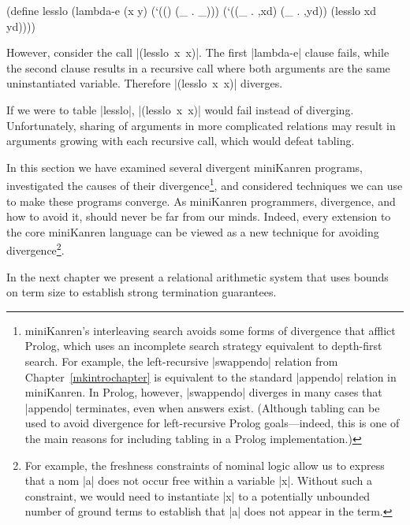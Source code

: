 \begin{enumerate}
\schemedisplayspace
\begin{schemebox}
(define lesslo
  (lambda-e (x y)
    (`(() (_ . _)))
    (`((_ . ,xd) (_ . ,yd))
     (lesslo xd yd))))
\end{schemebox}

However, consider the call \mbox{\scheme|(lesslo x x)|}.  The
first \scheme|lambda-e| clause fails, while the second clause results
in a recursive call where both arguments are the same uninstantiated
variable.  Therefore \mbox{\scheme|(lesslo x x)|} diverges.

If we were to table \scheme|lesslo|, \mbox{\scheme|(lesslo x x)|}
would fail instead of diverging.  Unfortunately, sharing of arguments
in more complicated relations may result in arguments growing with
each recursive call, which would defeat tabling.

\end{enumerate}

In this section we have examined several divergent miniKanren
programs, investigated the causes of their
divergence\footnote{miniKanren's interleaving search avoids some forms
  of divergence that afflict Prolog, which uses an incomplete search
  strategy equivalent to depth-first search.  For example, the
  left-recursive \scheme|swappendo| relation from
  Chapter~\ref{mkintrochapter} is equivalent to the standard
  \scheme|appendo| relation in miniKanren.  In Prolog, however,
  \scheme|swappendo| diverges in many cases that \scheme|appendo|
  terminates, even when answers exist.  (Although tabling can be used
  to avoid divergence for left-recursive Prolog goals---indeed, this
  is one of the main reasons for including tabling in a Prolog
  implementation.)}, and considered techniques we can use to make
these programs converge.  As miniKanren programmers, divergence, and
how to avoid it, should never be far from our minds.  Indeed, every
extension to the core miniKanren language can be viewed as a new
technique for avoiding divergence\footnote{For example, the freshness
  constraints of nominal logic allow us to express that a nom
  \scheme|a| does not occur free within a variable \scheme|x|.
  Without such a constraint, we would need to instantiate \scheme|x|
  to a potentially unbounded number of ground terms to establish that
  \scheme|a| does not appear in the term.}.

In the next chapter we present a relational arithmetic system that
uses bounds on term size to establish strong termination guarantees.



